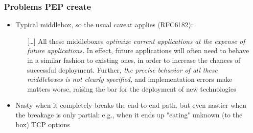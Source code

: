 \begin{frame}
  \frametitle{Problems PEP create}
  \begin{itemize}
    \item Typical middlebox, so the usual caveat applies (RFC6182):
    \begin{itemize}
      \item[] [\ldots] All these middleboxes \emph{optimize current applications at the expense of future applications.}  In effect, future applications will often need to behave in a similar fashion to existing ones, in order to increase the chances of successful deployment.  Further, \emph{the precise behavior of all these middleboxes is not clearly specified,} and implementation errors make matters worse, raising the bar for the deployment of new technologies
    \end{itemize}
    \item Nasty when it completely breaks the end-to-end path, but even nastier when the breakage is only partial: e.g., when it ends up "eating" unknown (to the box) TCP options
  \end{itemize}
\end{frame}
